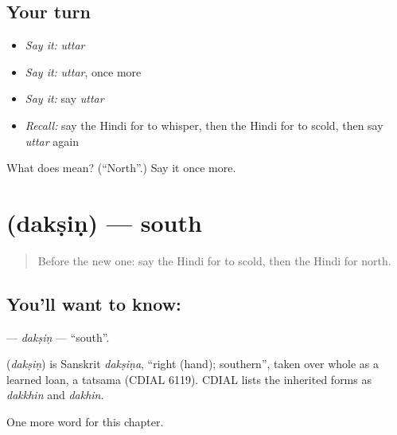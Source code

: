 \subsection*{Your turn}
\begin{itemize}
\raggedright
  \item \emph{Say it:} \emph{uttar}
  \item \emph{Say it:} \emph{uttar}, once more
  \item \emph{Say it:} say \emph{uttar}
  \item \emph{Recall:} say the Hindi for to whisper, then the Hindi for to scold, then say \emph{uttar} again
\end{itemize}

\begin{tcolorbox}[breakable,colback=teal!4,colframe=teal!35!black,title={Before you move on}]
What does  mean? (\textquotedblleft{}North\textquotedblright{}.) Say it once more.
\end{tcolorbox}
\section[\texorpdfstring{\hi{दक्षिण} (dakṣiṇ)}{दक्षिण (dakṣiṇ)}]{ (dakṣiṇ) — south}

\label{lesson:HI-C233-daksin}



\begin{quote}
Before the new one: say the Hindi for to scold, then the Hindi for north.
\end{quote}

\subsection*{You'll want to know: }
\textbf{} — \emph{dakṣiṇ} — \textquotedblleft{}south\textquotedblright{}.

\begin{cousinweb}
\textbf{} (\emph{dakṣiṇ}) is Sanskrit \emph{dakṣiṇa}, \textquotedblleft{}right (hand); southern\textquotedblright{}, taken over whole as a learned loan, a tatsama (CDIAL 6119). CDIAL lists the inherited forms as \emph{dakkhin} and \emph{dakhin}.
\end{cousinweb}

\begin{grammarlens}[title={What you've built}]
One more word for this chapter.
\end{grammarlens}

